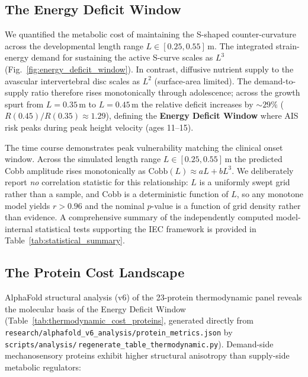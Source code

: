 \subsection{The Energy Deficit Window}

We quantified the metabolic cost of maintaining the S-shaped counter-curvature across the developmental length range $L \in [0.25, 0.55]$\,m. The integrated strain-energy demand for sustaining the active S-curve scales as $L^3$ (Fig.~\ref{fig:energy_deficit_window}). In contrast, diffusive nutrient supply to the avascular intervertebral disc scales as $L^2$ (surface-area limited). The demand-to-supply ratio therefore rises monotonically through adolescence; across the growth spurt from $L=0.35$\,m to $L=0.45$\,m the relative deficit increases by ${\sim}29\%$ ($R(0.45)/R(0.35)\approx 1.29$), defining the \textbf{Energy Deficit Window} where AIS risk peaks during peak height velocity (ages 11--15).

The time course demonstrates peak vulnerability matching the clinical onset window. Across the simulated length range $L \in [0.25, 0.55]$\,m the predicted Cobb amplitude rises monotonically as $\mathrm{Cobb}(L) \approx aL + bL^3$. We deliberately report \emph{no} correlation statistic for this relationship: $L$ is a uniformly swept grid rather than a sample, and Cobb is a deterministic function of $L$, so any monotone model yields $r > 0.96$ and the nominal $p$-value is a function of grid density rather than evidence. A comprehensive summary of the independently computed model-internal statistical tests supporting the IEC framework is provided in Table~\ref{tab:statistical_summary}.

\subsection{The Protein Cost Landscape}

AlphaFold structural analysis (v6) of the 23-protein thermodynamic panel reveals the molecular basis of the Energy Deficit Window (Table~\ref{tab:thermodynamic_cost_proteins}, generated directly from \texttt{research/alphafold\_v6\_analysis/protein\_metrics.json} by \texttt{scripts/analysis/}$\,$\texttt{regenerate\_table\_thermodynamic.py}). Demand-side mechanosensory proteins exhibit higher structural anisotropy than supply-side metabolic regulators:

